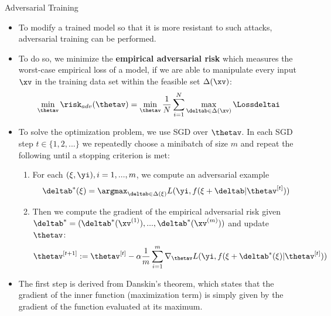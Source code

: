 \documentclass[11pt,compress,t,notes=noshow, xcolor=table]{beamer}
\begin{document}
\begin{vbframe}{Adversarial Training}
    \begin{itemize}
        \item To modify a trained model so that it is more resistant to such attacks, adversarial training can be performed. 
        \lz
          \lz
        \item To do so, we minimize the \textbf{empirical adversarial risk} which measures the worst-case empirical loss of a model, if we are able to manipulate every input $\xv$ in the training data set within the feasible set $\Delta(\xv)$:
        \begin{equation*}
            \min_{\thetav} \risk_{adv}(\thetav) = \min_{\thetav} \frac{1}{N} \sum_{i = 1}^{N} \max_{\deltab \in \Delta(\xv)} \Lossdeltai
        \end{equation*}
          
          \framebreak
      
        \item To solve the optimization problem, we use SGD over $\thetav$. In each SGD step $t \in \{1, 2,...\}$ we repeatedly choose a minibatch of size $m$ and repeat the following until a stopping criterion is met: 
        \begin{enumerate}
            \item For each $(\xi, \yi), i = 1, ..., m$, we compute an adversarial example 
            \begin{equation*}
                \deltab^{*}(\xi) = \argmax_{\deltab \in \Delta(\xi)} L(\yi, f(\xi + \deltab| \thetav^{[t]}))
            \end{equation*}
            \item Then we compute the gradient of the empirical adversarial risk given $\deltab^* = (\deltab^*(\xv^{(1)}), ..., \deltab^*(\xv^{(m)}))$ and update $\thetav$: 
            \begin{equation*}
                \thetav^{[t+1]} := \thetav^{[t]} - \alpha \frac{1}{m} \sum_{i = 1}^{m} \nabla_{\thetav} L(\yi, f(\xi + \deltab^*(\xi)| \thetav^{[t]}))
            \end{equation*}
        \end{enumerate}
        \item The first step is derived from Danskin's theorem, which states that the gradient of the inner function (maximization term) is simply given by the gradient of the function evaluated at its maximum.
    \end{itemize}
\end{vbframe}
\end{document}
